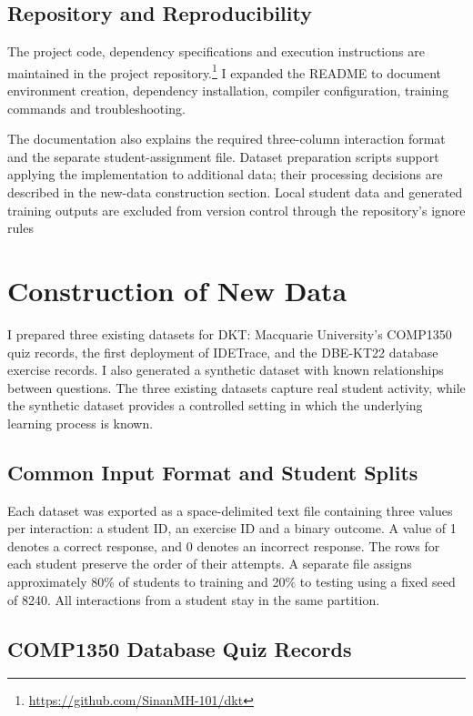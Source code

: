 \documentclass[11pt]{article}
\begin{document}
\subsection{Repository and Reproducibility}

The project code, dependency specifications and execution instructions are maintained in the project repository.\footnote{\url{https://github.com/SinanMH-101/dkt}} I expanded the README to document environment creation, dependency installation, compiler configuration, training commands and troubleshooting.

The documentation also explains the required three-column interaction format and the separate student-assignment file. Dataset preparation scripts support applying the implementation to additional data; their processing decisions are described in the new-data construction section. Local student data and generated training outputs are excluded from version control through the repository's ignore rules


\section{Construction of New Data}

I prepared three existing datasets for DKT: Macquarie University's
COMP1350 quiz records, the first deployment of IDETrace, and the
DBE-KT22 database exercise records. I also generated a synthetic
dataset with known relationships between questions. The three
existing datasets capture real student activity, while the synthetic
dataset provides a controlled setting in which the underlying
learning process is known.

\subsection{Common Input Format and Student Splits}

Each dataset was exported as a space-delimited text file containing
three values per interaction: a student ID, an exercise ID and a
binary outcome. A value of 1 denotes a correct response, and 0 denotes
an incorrect response. The rows for each student preserve the order
of their attempts. A separate file assigns approximately 80\% of
students to training and 20\% to testing using a fixed seed of 8240.
All interactions from a student stay in the same partition.

\subsection{COMP1350 Database Quiz Records}
\end{document}
